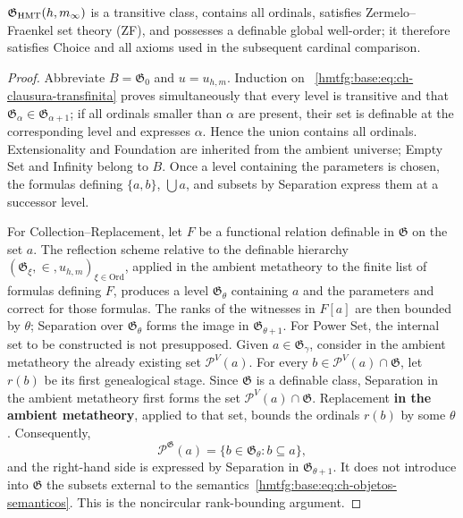 \begin{lemma}
\label{hmtfg:base:thm:ch-6b}
\(\mathfrak G_{\rm HMT}(h,m_\infty)\) is a transitive class, contains all
ordinals, satisfies Zermelo--Fraenkel set theory (ZF), and possesses a
definable global well-order; it therefore satisfies Choice and all axioms used
in the subsequent cardinal comparison.

\end{lemma}
\begin{proof}
Abbreviate \(B=\mathfrak G_0\) and \(u=u_{h,m}\). Induction on
~\eqref{hmtfg:base:eq:ch-clausura-transfinita} proves simultaneously that every level is
transitive and that \(\mathfrak G_\alpha\in\mathfrak G_{\alpha+1}\); if all
ordinals smaller than \(\alpha\) are present, their set is definable at the
corresponding level and expresses \(\alpha\). Hence the union contains all
ordinals. Extensionality and Foundation are inherited from the ambient
universe; Empty Set and Infinity belong to \(B\). Once a level containing the
parameters is chosen, the formulas defining \(\{a,b\}\), \(\bigcup a\), and
subsets by Separation express them at a successor level.

For Collection--Replacement, let \(F\) be a functional relation definable in
\(\mathfrak G\) on the set \(a\). The reflection scheme relative to the
definable hierarchy
\((\mathfrak G_\xi,\in,u_{h,m})_{\xi\in\mathrm{Ord}}\), applied in the ambient
metatheory to the finite list of formulas defining \(F\), produces a level
\(\mathfrak G_\theta\) containing \(a\) and the parameters and correct for
those formulas. The ranks of the witnesses in \(F[a]\) are then bounded by
\(\theta\); Separation over \(\mathfrak G_\theta\) forms the image in
\(\mathfrak G_{\theta+1}\). For Power Set, the internal set to be constructed
is not presupposed. Given \(a\in\mathfrak G_\gamma\), consider in the ambient
metatheory the already existing set \(\mathcal P^V(a)\). For every
\(b\in\mathcal P^V(a)\cap\mathfrak G\), let \(r(b)\) be its first
genealogical stage. Since \(\mathfrak G\) is a definable class, Separation in
the ambient metatheory first forms the set
\(\mathcal P^V(a)\cap\mathfrak G\). Replacement \textbf{in the ambient
metatheory}, applied to that set, bounds the ordinals \(r(b)\) by some
\(\theta\). Consequently,
\[
 \mathcal P^{\mathfrak G}(a)
 =\{b\in\mathfrak G_\theta:b\subseteq a\},
\]
and the right-hand side is expressed by Separation in
\(\mathfrak G_{\theta+1}\). It does not introduce into \(\mathfrak G\) the
subsets external to the semantics~\eqref{hmtfg:base:eq:ch-objetos-semanticos}. This is the
noncircular rank-bounding argument.


\end{proof}

